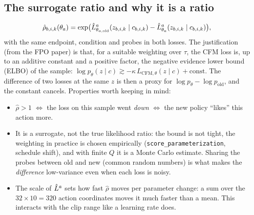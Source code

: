 \subsection{The surrogate ratio  and why it is a ratio}
\begin{equation}
\hat\rho_{b,i,k}(\theta_a)=\exp\!\big(\hat L^{a}_{\theta_{a,\mathrm{old}}}(z_{b,i,k}\mid c_{b,i,k})-\hat L^{a}_{\theta_a}(z_{b,i,k}\mid c_{b,i,k})\big),
\label{loop:eq:ratio}
\end{equation}
with the same endpoint, condition and probes in both losses. The justification (from the FPO paper) is that, for a suitable weighting over $\tau$, the CFM loss is, up to an additive constant and a positive factor, the negative evidence lower bound (ELBO) of the sample: $\log p_\theta(z\mid c)\gtrsim-\kappa\,L_{\mathrm{CFM},\theta}(z\mid c)+\text{const}$. The difference of two losses at the same $z$ is then a proxy for $\log p_\theta-\log p_{\mathrm{old}}$, and the constant cancels. Properties worth keeping in mind:
\begin{itemize}
\item $\hat\rho>1$ $\Leftrightarrow$ the loss on this sample went \emph{down} $\Leftrightarrow$ the new policy ``likes'' this action more.
\item It is a surrogate, not the true likelihood ratio: the bound is not tight, the weighting in practice is chosen empirically (\texttt{score\_parameterization}, schedule shift), and with finite $Q$ it is a Monte Carlo estimate. Sharing the probes between old and new (common random numbers) is what makes the \emph{difference} low-variance even when each loss is noisy.
\item The scale of $\hat L^{a}$ sets how fast $\hat\rho$ moves per parameter change: a sum over the $32\times10=320$ action coordinates moves it much faster than a mean. This interacts with the clip range like a learning rate does.
\end{itemize}

